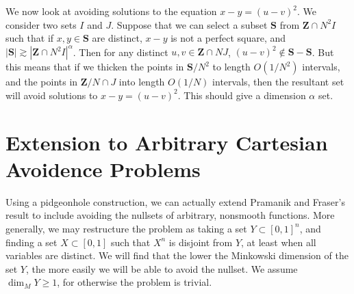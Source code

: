 \documentclass{report}
\theoremstyle{plain}
\theoremstyle{plain}
\begin{document}
We now look at avoiding solutions to the equation $x - y = (u - v)^2$. We consider two sets $I$ and $J$. Suppose that we can select a subset $\mathbf{S}$ from $\mathbf{Z} \cap N^2I$ such that if $x,y \in \mathbf{S}$ are distinct, $x - y$ is not a perfect square, and $|\mathbf{S}| \gtrsim |\mathbf{Z} \cap N^2I|^\alpha$. Then for any distinct $u,v \in \mathbf{Z} \cap NJ$, $(u - v)^2 \not \in \mathbf{S} - \mathbf{S}$. But this means that if we thicken the points in $\mathbf{S}/N^2$ to length $O(1/N^2)$ intervals, and the points in $\mathbf{Z}/N \cap J$ into length $O(1/N)$ intervals, then the resultant set will avoid solutions to $x - y = (u - v)^2$. This should give a dimension $\alpha$ set.










\chapter{Extension to Arbitrary Cartesian Avoidence Problems}

Using a pidgeonhole construction, we can actually extend Pramanik and Fraser's result to include avoiding the nullsets of arbitrary, nonsmooth functions. More generally, we may restructure the problem as taking a set $Y \subset [0,1]^n$, and finding a set $X \subset [0,1]$ such that $X^n$ is disjoint from $Y$, at least when all variables are distinct. We will find that the lower the Minkowski dimension of the set $Y$, the more easily we will be able to avoid the nullset. We assume $\dim_M Y \geq 1$, for otherwise the problem is trivial.
\end{document}
